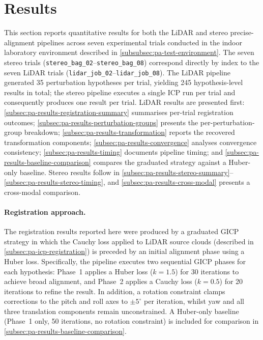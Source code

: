 \section{Results}
\label{sec:precise-alignment-results}

This section reports quantitative results for both the LiDAR and stereo precise-alignment pipelines across seven experimental trials conducted in the indoor laboratory environment described in \cref{subsubsec:pa-test-environment}. The seven stereo trials (\texttt{stereo\_bag\_02}--\texttt{stereo\_bag\_08}) correspond directly by index to the seven LiDAR trials (\texttt{lidar\_job\_02}--\texttt{lidar\_job\_08}). The LiDAR pipeline generated 35 perturbation hypotheses per trial, yielding 245 hypothesis-level results in total; the stereo pipeline executes a single ICP run per trial and consequently produces one result per trial. LiDAR results are presented first: \cref{subsec:pa-results-registration-summary} summarises per-trial registration outcomes; \cref{subsec:pa-results-perturbation-groups} presents the per-perturbation-group breakdown; \cref{subsec:pa-results-transformation} reports the recovered transformation components; \cref{subsec:pa-results-convergence} analyses convergence consistency; \cref{subsec:pa-results-timing} documents pipeline timing; and \cref{subsec:pa-results-baseline-comparison} compares the graduated strategy against a Huber-only baseline. Stereo results follow in \cref{subsec:pa-results-stereo-summary}--\cref{subsec:pa-results-stereo-timing}, and \cref{subsec:pa-results-cross-modal} presents a cross-modal comparison.

\paragraph{Registration approach.}
The registration results reported here were produced by a graduated GICP strategy in which the Cauchy loss applied to LiDAR source clouds (described in \cref{subsec:pa-icp-registration}) is preceded by an initial alignment phase using a Huber loss. Specifically, the pipeline executes two sequential GICP phases for each hypothesis: Phase~1 applies a Huber loss ($k = 1.5$) for 30 iterations to achieve broad alignment, and Phase~2 applies a Cauchy loss ($k = 0.5$) for 20 iterations to refine the result. In addition, a rotation constraint clamps corrections to the pitch and roll axes to $\pm 5^{\circ}$ per iteration, whilst yaw and all three translation components remain unconstrained. A Huber-only baseline (Phase~1 only, 50 iterations, no rotation constraint) is included for comparison in \cref{subsec:pa-results-baseline-comparison}.

